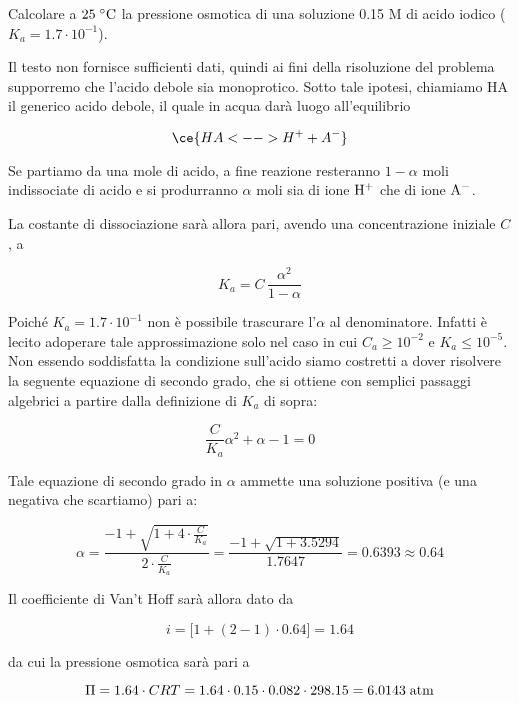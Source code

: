 \begin{esercizio}
    Calcolare a $25 \; ^{\circ} \rm C$ la pressione osmotica di una soluzione 0.15 M di acido iodico ($K_a=1.7 \cdot 10^{-1}$).
\end{esercizio}
\begin{soluzione}
    Il testo non fornisce sufficienti dati, quindi ai fini della risoluzione del problema supporremo che l'acido debole sia monoprotico. Sotto tale ipotesi, chiamiamo HA il generico acido debole, il quale in acqua darà luogo all'equilibrio

$$\ce{HA <--> H^+ + A^-}$$

Se partiamo da una mole di acido, a fine reazione resteranno $1 - \alpha$ moli indissociate di acido e si produrranno $\alpha$ moli sia di ione $\rm H^+$ che di ione $\rm A^-$. 

La costante di dissociazione sarà allora pari, avendo una concentrazione iniziale $C$, a

$$K_a=C\,\frac{\alpha^2}{1-\alpha}$$

Poiché $K_a=1.7 \cdot 10^{-1}$ non è possibile trascurare l'$\alpha$ al denominatore. Infatti è lecito adoperare tale approssimazione solo nel caso in cui $C_a \geq 10^{-2}$ e $K_a \leq 10^{-5}$. Non essendo soddisfatta la condizione sull'acido siamo costretti a dover risolvere la seguente equazione di secondo grado, che si ottiene con semplici passaggi algebrici a partire dalla definizione di $K_a$ di sopra:

$$\frac{C}{K_a}\alpha^2 + \alpha -1=0$$

Tale equazione di secondo grado in $\alpha$ ammette una soluzione positiva (e una negativa che scartiamo) pari a:

$$\alpha=\frac{-1 + \sqrt{1 + 4 \cdot \displaystyle \frac{C}{K_a}}}{2 \cdot \displaystyle \frac{C}{K_a}}
=\frac{-1 + \sqrt{1 + 3.5294}}{1.7647}=0.6393\approx0.64$$

Il coefficiente di Van't Hoff sarà allora dato da

$$i=\big[1 + (2-1) \cdot 0.64\big]=1.64$$

da cui la pressione osmotica sarà pari a

$$\Pi=1.64 \cdot CRT
=1.64 \cdot 0.15 \cdot 0.082 \cdot 298.15
=6.0143 \; \rm atm$$
\end{soluzione}

\newpage

